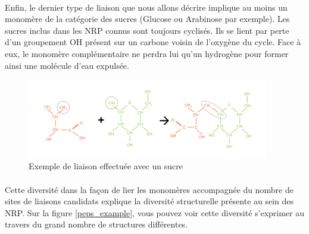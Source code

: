 \documentclass[12pt,french,twoside]{report}
\begin{document}
\paragraph{}Enfin, le dernier type de liaison que nous allons décrire implique au moins un monomère de la catégorie des sucres (Glucose ou Arabinose par exemple).
Les sucres inclus dans les NRP connus sont toujours cyclisés.
Ils se lient par perte d'un groupement OH présent sur un carbone voisin de l'oxygène du cycle.
Face à eux, le monomère complémentaire ne perdra lui qu'un hydrogène pour former ainsi une molécule d'eau expulsée.

\begin{figure}[h!]
  \begin{center}
    \includegraphics[width=400px]{Figures/bio/Intro/reactions/ose.jpg}
    \caption{\label{ose}Exemple de liaison effectuée avec un sucre}
  \end{center}
\end{figure}

\paragraph{}Cette diversité dans la façon de lier les monomères accompagnée du nombre de sites de liaisons candidats explique la diversité structurelle présente au sein des NRP.
Sur la figure \ref{peps_example}, vous pouvez voir cette diversité s'exprimer au travers du grand nombre de structures différentes.
\end{document}
